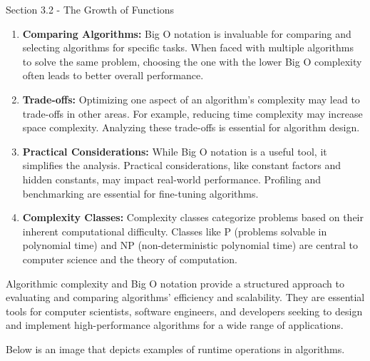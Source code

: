 \begin{notes}{Section 3.2 - The Growth of Functions}
\begin{enumerate}
        \item \textbf{Comparing Algorithms:} Big O notation is invaluable for comparing and selecting algorithms for specific tasks. When faced with multiple algorithms to solve the same problem, 
        choosing the one with the lower Big O complexity often leads to better overall performance.
    
        \item \textbf{Trade-offs:} Optimizing one aspect of an algorithm's complexity may lead to trade-offs in other areas. For example, reducing time complexity may increase space complexity. 
        Analyzing these trade-offs is essential for algorithm design.
    
        \item \textbf{Practical Considerations:} While Big O notation is a useful tool, it simplifies the analysis. Practical considerations, like constant factors and hidden constants, may impact 
        real-world performance. Profiling and benchmarking are essential for fine-tuning algorithms.
    
        \item \textbf{Complexity Classes:} Complexity classes categorize problems based on their inherent computational difficulty. Classes like P (problems solvable in polynomial time) and NP 
        (non-deterministic polynomial time) are central to computer science and the theory of computation.
    
    \end{enumerate}
    
    Algorithmic complexity and Big O notation provide a structured approach to evaluating and comparing algorithms' efficiency and scalability. They are essential tools for computer scientists, 
    software engineers, and developers seeking to design and implement high-performance algorithms for a wide range of applications.

    \begin{highlight}
        Below is an image that depicts examples of runtime operations in algorithms.

        \begin{center}
        \end{center}


\end{highlight}
\end{notes}
